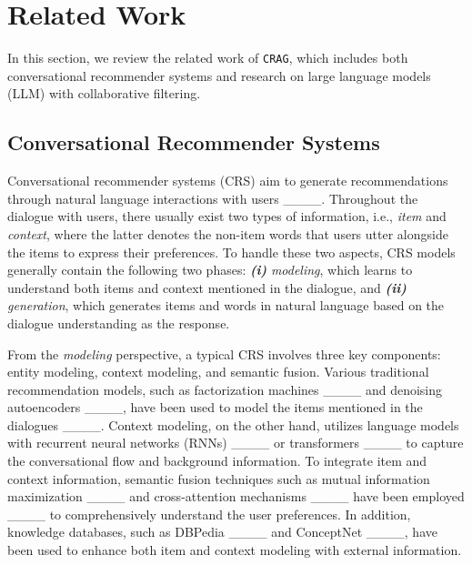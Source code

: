 \section{Related Work}
\label{sec:rel_work}

In this section, we review the related work of \texttt{CRAG}, which includes both conversational recommender systems and research on large language models (LLM) with collaborative filtering.

\subsection{Conversational Recommender Systems}

Conversational recommender systems (CRS) aim to generate recommendations through natural language interactions with users ____. Throughout the dialogue with users, there usually exist two types of information, i.e., \textit{item} and \textit{context}, where the latter denotes the non-item words that users utter alongside the items to express their preferences. To handle these two aspects, CRS models generally contain the following two phases: \textbf{\textit{(i)}} \textit{modeling}, which learns to understand both items and context mentioned in the dialogue, and \textbf{\textit{(ii)}} \textit{generation}, which generates items and words in natural language based on the dialogue understanding as the response. 

From the \textit{modeling} perspective, a typical CRS involves three key components: entity modeling, context modeling, and semantic fusion. Various traditional recommendation models, such as factorization machines ____ and denoising autoencoders ____, have been used to model the items mentioned in the dialogues ____. Context modeling, on the other hand, utilizes language models with recurrent neural networks (RNNs) ____ or transformers ____ to capture the conversational flow and background information. To integrate item and context information, semantic fusion techniques such as mutual information maximization ____ and cross-attention mechanisms ____ have been employed ____ to comprehensively understand the user preferences. In addition, knowledge databases, such as DBPedia ____ and ConceptNet ____, have been used to enhance both item and context modeling with external information. 

